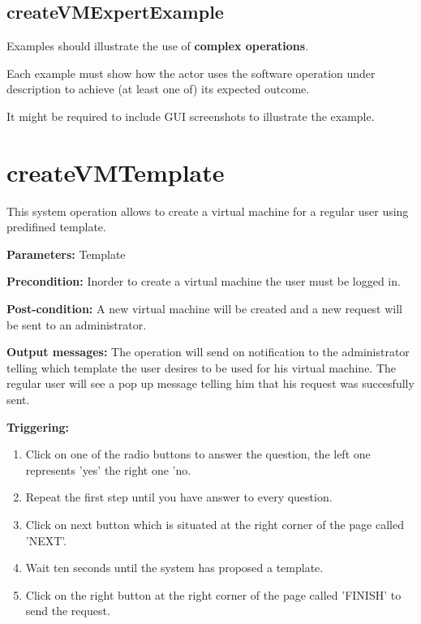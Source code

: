  
\subsection{createVMExpertExample}
Examples should illustrate the use of \textbf{complex operations}.

Each example must show how the actor uses the software operation under
description to achieve (at least one of) its expected outcome.

It might be required to include GUI screenshots to illustrate the example.







\section{createVMTemplate}
\label{operation:createVMTemplate}
This system operation allows to create a virtual machine for a regular user
using predifined template.

\begin{description}

\item \textbf{Parameters:} Template
\item \textbf{Precondition:} Inorder to create a virtual machine the user must
be logged in.
\item \textbf{Post-condition:} A new virtual machine will be created and a new
request will be sent to an administrator.
\item \textbf{Output messages:} The operation will send on notification to the
administrator telling which template the user desires to be used for his virtual
machine. The regular user will see a pop up message telling him that his request
was succesfully sent.

\item \textbf{Triggering:}
\begin{enumerate}
\item Click on one of the radio buttons to answer the question, the left one
represents 'yes' the right one 'no.
\item Repeat the first step until you have answer to every question.
\item Click on next button which is situated at the right corner of the page
called 'NEXT'.
\item Wait ten seconds until the system has proposed a template.
\item Click on the right button at the right corner of the page called 'FINISH'
to send the request.
\end{enumerate}

 
\end{description}

